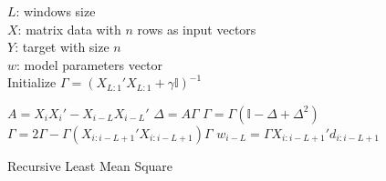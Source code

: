 \begin{algorithm}[ht]
\begin{algorithmic}[1]
\REQUIRE $\,$ \\
$L$: windows size \\
$X$: matrix data with $n$ rows as input vectors \\
$Y$: target with size $n$ \\ 
\ENSURE  $\,$ \\
$w$: model parameters vector\\
\STATE Initialize $\Gamma=(X_{L:1}' X_{L:1} + \gamma \mathbb{I})^{-1}$

  
    \STATE $A=X_i X_i' - X_{i-L} X_{i-L}'$
    \STATE $\Delta = A \Gamma$
    \STATE $\Gamma=\Gamma (\mathbb{I} - \Delta + \Delta^2) \quad$  
    \STATE $\Gamma=2\Gamma-\Gamma(X_{i:i-L+1}' X_{i:i-L+1})\Gamma$ 
     \STATE $w_{i-L} = \Gamma X_{i:i-L+1}'d_{i:i-L+1}$
\ENDFOR


\end{algorithmic}
\caption{Recursive Least Mean Square}
\label{alg:rlms}
\end{algorithm}

